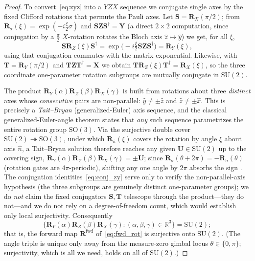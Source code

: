 \documentclass[11pt]{article}
\newcommand{\SU}{\mathrm{SU}}
\newcommand{\bbR}{\mathbb{R}}
\theoremstyle{plain}
\theoremstyle{plain}
\begin{document}
\begin{proof}
To convert~\eqref{eq:zyz} into a $Y ZX$ sequence we conjugate single
axes by the fixed Clifford rotations that permute the Pauli axes. Let
$\mathbf{S}=\mathbf{R}_X(\pi/2)$; from $\mathbf{R}_\sigma(\xi)=\exp(-i\tfrac\xi2\sigma)$ and
$\mathbf{S} \mathbf{Z} \mathbf{S}^\dagger=\mathbf{Y}$ (a direct $2\times2$ computation, since
conjugation by a $\tfrac\pi2$ $X$-rotation rotates the Bloch axis
$\hat z\mapsto\hat y$) we get, for all $\xi$,
\begin{equation}\label{eq:conj_zy}
  \mathbf{S} \mathbf{R}_Z(\xi) \mathbf{S}^\dagger
  = \exp \bigl(-i\tfrac\xi2 \mathbf{S}\mathbf{Z}\mathbf{S}^\dagger\bigr)
  = \mathbf{R}_Y(\xi),
\end{equation}
using that conjugation commutes with the matrix exponential. Likewise,
with $\mathbf{T}=\mathbf{R}_Y(\pi/2)$ and $\mathbf{T} \mathbf{Z} \mathbf{T}^\dagger=\mathbf{X}$ we obtain
$\mathbf{T} \mathbf{R}_Z(\xi) \mathbf{T}^\dagger=\mathbf{R}_X(\xi)$, so the three coordinate
one-parameter rotation subgroups are mutually conjugate in $\SU(2)$.

The product $\mathbf{R}_Y(\alpha) \mathbf{R}_Z(\beta) \mathbf{R}_X(\gamma)$ is built from
rotations about three \emph{distinct} axes whose \emph{consecutive} pairs
are non-parallel: $\hat y\neq\pm\hat z$ and $\hat z\neq\pm\hat x$.  This is
precisely a \emph{Tait--Bryan} (generalized-Euler) axis sequence, and the
classical generalized-Euler-angle theorem states that \emph{any} such
sequence parametrizes the entire rotation group $\mathrm{SO}(3)$.  Via the
surjective double cover $\SU(2)\twoheadrightarrow\mathrm{SO}(3)$, under which
$\mathbf{R}_{\hat n}(\xi)$ covers the rotation by angle $\xi$ about axis $\hat n$,
a Tait--Bryan solution therefore reaches any given $\mathbf{U}\in\SU(2)$ up to
the covering sign, $\mathbf{R}_Y(\alpha)\mathbf{R}_Z(\beta)\mathbf{R}_X(\gamma)=\pm\mathbf{U}$;
since $\mathbf{R}_\sigma(\theta+2\pi)=-\mathbf{R}_\sigma(\theta)$ (rotation gates are
$4\pi$-periodic), shifting any one angle by $2\pi$ absorbs the sign
\cite{nielsen2010quantum}.  The conjugation identities~\eqref{eq:conj_zy}
serve only to verify the non-parallel-axis hypothesis (the three subgroups
are genuinely distinct one-parameter groups); we do \emph{not} claim the
fixed conjugators $\mathbf{S},\mathbf{T}$ telescope through the product---they do
not---and we do not rely on a degree-of-freedom count, which would
establish only local surjectivity.  Consequently
\begin{equation}\label{eq:yzx_surj}
 \{\mathbf{R}_Y(\alpha) \mathbf{R}_Z(\beta) \mathbf{R}_X(\gamma)
    : (\alpha,\beta,\gamma)\in\bbR^3\} = \SU(2);
\end{equation}
that is, the forward map $\mathbf{R}^{\mathrm{fwd}}$ of~\eqref{eq:fwd_rot} is
surjective onto $\SU(2)$.  (The angle triple is unique only away from the
measure-zero gimbal locus $\theta\in\{0,\pi\}$; surjectivity, which is all
we need, holds on all of $\SU(2)$.)


\end{proof}
\end{document}
